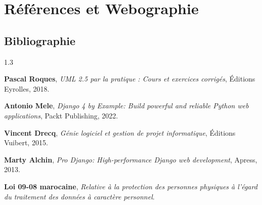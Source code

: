 \chapter*{Références et Webographie}

\section*{Bibliographie}
\begin{spacing}{1.3}
\begin{enumerate}[label={[\arabic*]}]
    \item \textbf{Pascal Roques}, \emph{UML 2.5 par la pratique : Cours et exercices corrigés}, Éditions Eyrolles, 2018.
    \item \textbf{Antonio Mele}, \emph{Django 4 by Example: Build powerful and reliable Python web applications}, Packt Publishing, 2022.
    \item \textbf{Vincent Drecq}, \emph{Génie logiciel et gestion de projet informatique}, Éditions Vuibert, 2015.
    \item \textbf{Marty Alchin}, \emph{Pro Django: High-performance Django web development}, Apress, 2013.
    \item \textbf{Loi 09-08 marocaine}, \emph{Relative à la protection des personnes physiques à l'égard du traitement des données à caractère personnel}.
\end{enumerate}
\end{spacing}

\vspace{1cm}

